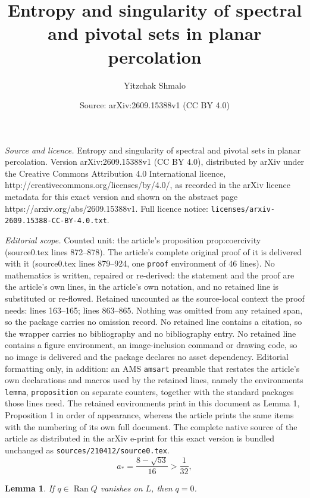 \documentclass[10pt,a4paper]{amsart}
\title{Entropy and singularity of spectral and pivotal sets in planar percolation}
\author{Yitzchak Shmalo}
\date{Source: arXiv:2609.15388v1 (CC BY 4.0)}
\newtheorem{lemma}{Lemma}
\newcommand{\astar}{a_*}
\begin{document}
\maketitle

\noindent\emph{Source and licence.} Entropy and singularity of spectral and pivotal sets in planar percolation. Version arXiv:2609.15388v1 (CC BY 4.0), distributed by arXiv under the Creative Commons Attribution 4.0 International licence, http://creativecommons.org/licenses/by/4.0/, as recorded in the arXiv licence metadata for this exact version and shown on the abstract page https://arxiv.org/abs/2609.15388v1. Full licence notice: \texttt{licenses/arxiv-2609.15388-CC-BY-4.0.txt}.\par\smallskip

\noindent\textit{Editorial scope.} Counted unit: the article's proposition prop:coercivity (source0.tex lines 872--878). The article's complete original proof of it is delivered with it (source0.tex lines 879--924, one \texttt{proof} environment of 46 lines). No mathematics is written, repaired or re-derived: the statement and the proof are the article's own lines, in the article's own notation, and no retained line is substituted or re-flowed.  Retained uncounted as the source-local context the proof needs: lines 163--165; lines 863--865.  Nothing was omitted from any retained span, so the package carries no omission record.  No retained line contains a citation, so the wrapper carries no bibliography and no bibliography entry.  No retained line contains a figure environment, an image-inclusion command or drawing code, so no image is delivered and the package declares no asset dependency.  Editorial formatting only, in addition: an AMS \texttt{amsart} preamble that restates the article's own declarations and macros used by the retained lines, namely the environments \texttt{lemma}, \texttt{proposition} on separate counters, together with the standard packages those lines need.  The retained environments print in this document as Lemma 1, Proposition 1 in order of appearance, whereas the article prints the same items with the numbering of its own full document.  The complete native source of the article as distributed in the arXiv e-print for this exact version is bundled unchanged as \texttt{sources/210412/source0.tex}.
\begin{equation}\label{eq:astar}
 \astar=\frac{8-\sqrt{53}}{16}>\frac1{32},
\end{equation}

\begin{lemma}\label{lem:rank}
If $q\in\operatorname{Ran}Q$ vanishes on $L$, then $q=0$.
\end{lemma}
\end{document}
